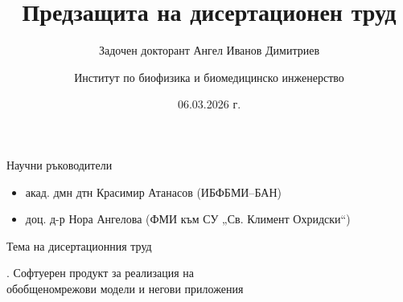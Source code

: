 \documentclass[aspectratio=169]{beamer}
\title[Предзащита на дисертационен труд]{Предзащита на дисертационен труд}
\subtitle{Задочен докторант Ангел Иванов Димитриев}
\author{Институт по биофизика и биомедицинско инженерство}
\institute{ИБФБМИ–БАН \;|\; ФМИ към СУ „Св. Климент Охридски“}
\date{06.03.2026 г.}
\begin{document}
\begin{frame}[plain]
  \titlepage
  \vspace{-1.0em}
  \begin{block}{Научни ръководители}
    \begin{itemize}
      \item акад. дмн дтн Красимир Атанасов (ИБФБМИ–БАН)
      \item доц. д-р Нора Ангелова (ФМИ към СУ „Св. Климент Охридски“)
    \end{itemize}
  \end{block}
\end{frame}

\begin{frame}{Тема на дисертационния труд}
    \begin{center}
        \begin{minipage}{0.8\textwidth}
            \begin{block}{.} 
                \centering
                \vspace{0.2cm}
                \large
                Софтуерен продукт за реализация на\\ 
                обобщеномрежови модели и негови приложения
                \vspace{0.2cm}
            \end{block}
        \end{minipage}
    \end{center}
\end{frame}
\end{document}
